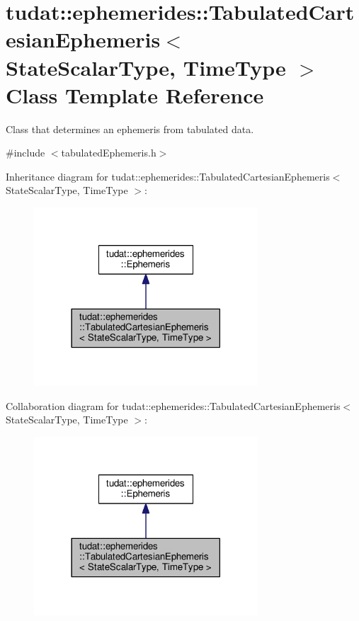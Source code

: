 \hypertarget{classtudat_1_1ephemerides_1_1TabulatedCartesianEphemeris}{}\section{tudat\+:\+:ephemerides\+:\+:Tabulated\+Cartesian\+Ephemeris$<$ State\+Scalar\+Type, Time\+Type $>$ Class Template Reference}
\label{classtudat_1_1ephemerides_1_1TabulatedCartesianEphemeris}


Class that determines an ephemeris from tabulated data.  




{\ttfamily \#include $<$tabulated\+Ephemeris.\+h$>$}



Inheritance diagram for tudat\+:\+:ephemerides\+:\+:Tabulated\+Cartesian\+Ephemeris$<$ State\+Scalar\+Type, Time\+Type $>$\+:
\nopagebreak
\begin{figure}[H]
\begin{center}
\leavevmode
\includegraphics[width=237pt]{classtudat_1_1ephemerides_1_1TabulatedCartesianEphemeris__inherit__graph}
\end{center}
\end{figure}


Collaboration diagram for tudat\+:\+:ephemerides\+:\+:Tabulated\+Cartesian\+Ephemeris$<$ State\+Scalar\+Type, Time\+Type $>$\+:
\nopagebreak
\begin{figure}[H]
\begin{center}
\leavevmode
\includegraphics[width=237pt]{classtudat_1_1ephemerides_1_1TabulatedCartesianEphemeris__coll__graph}
\end{center}
\end{figure}
